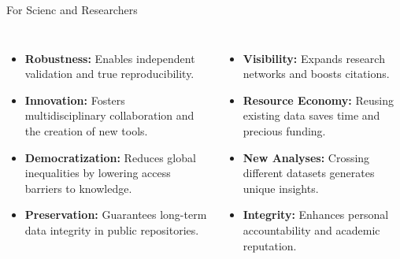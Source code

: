 \documentclass[aspectratio=169]{beamer}
\begin{document}
\begin{frame}{For Scienc and Researchers}
  \begin{columns}[T,onlytextwidth]
      \vspace{.5em}
      
      \begin{itemize}
        \item \textbf{Robustness:} Enables independent validation and true reproducibility.
        \item \textbf{Innovation:} Fosters multidisciplinary collaboration and the creation of new tools.
        \item \textbf{Democratization:} Reduces global inequalities by lowering access barriers to knowledge.
        \item \textbf{Preservation:} Guarantees long-term data integrity in public repositories.
      \end{itemize}

      \vspace{.5em}
      
      \begin{itemize}
        \item \textbf{Visibility:} Expands research networks and boosts citations.
        \item \textbf{Resource Economy:} Reusing existing data saves time and precious funding.
        \vspace{0.3em}
        
         
        \vspace{0.5em}
        
        \item \textbf{New Analyses:} Crossing different datasets generates unique insights.
        \item \textbf{Integrity:} Enhances personal accountability and academic reputation.
      \end{itemize}
  \end{columns}
\end{frame}
\end{document}
